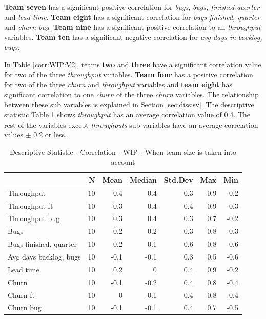 \documentclass[UKenglish]{ifimaster}  %
\begin{document}
\textbf{Team seven} has a significant positive correlation for \textit{bugs}, \textit{bugs, finished quarter} and \textit{lead time}. \textbf{Team eight} has a significant correlation for \textit{bugs finished, quarter} and \textit{churn bug}. \textbf{Team nine} has a significant positive correlation to all \textit{throughput} variables. \textbf{Team ten} has a significant negative correlation for \textit{avg days in backlog, bugs}.

In Table \ref{corr:WIP:V2}, teams \textbf{two} and \textbf{three} have a significant correlation value for two of the three \textit{throughput} variables. \textbf{Team four} has a positive correlation for two of the three \textit{churn} and \textit{throughput} variables and \textbf{team eight} has significant correlation to one \textit{churn} of the three \textit{churn} variables. The relationship between these sub variables is explained in Section \ref{sec:diss:sv}. The descriptive statistic Table \ref{DS:corr:WIP:v2} shows \textit{throughput} has an average correlation value of 0.4. The rest of the variables except \textit{throughputs} sub variables have an average correlation values $\pm$ 0.2 or less. 


\begin{minipage}[t]{\linewidth}
\begin{table}[H]
 \centering
 \begin{tabular}{ | l | r | r | r | r | r | r | }
 \hline
& \bf{N} & \bf{Mean} & \bf{Median} & \bf{Std.Dev} & \bf{Max} & \bf{Min} \\ \hline
Throughput  & 10 & 0.4 & 0.4 & 0.3 & 0.9 & -0.2\\ \hline
Throughput ft  & 10 & 0.3 & 0.4 & 0.4 & 0.9 & -0.3\\ \hline
Throughput bug  & 10 & 0.3 & 0.4 & 0.3 & 0.7 & -0.2\\ \hline
Bugs  & 10 & 0.2 & 0.2 & 0.3 & 0.8 & -0.3\\ \hline
Bugs finished, quarter  & 10 & 0.2 & 0.1 & 0.6 & 0.8 & -0.6\\ \hline
Avg days backlog, bugs  & 10 & -0.1 & -0.1 & 0.3 & 0.5 & -0.6\\ \hline
Lead time & 10 & 0.2 & 0 & 0.4 & 0.9 & -0.2\\ \hline
Churn  & 10 & -0.1 & -0.2 & 0.4 & 0.8 & -0.4\\ \hline
Churn ft  & 10 & 0 & -0.1 & 0.4 & 0.8 & -0.4\\ \hline
Churn bug  & 10 & -0.1 & -0.1 & 0.4 & 0.7 & -0.5\\ \hline
\end{tabular}
 \caption{Descriptive Statistic - Correlation - WIP - When team size is taken into account}
 \label{DS:corr:WIP:v2}
 \end{table}
\end{minipage}
\end{document}
